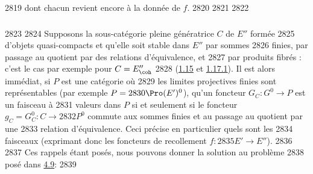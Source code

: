   2819	dont chacun revient encore à la donnée de $f$.
  2820	
  2821	\setcounter{subsubsection}{9}
  2822	\subsubsection{}
  2823	
  2824	Supposons la sous-catégorie pleine génératrice $C$ de $E''$ formée
  2825	d'objets quasi-compacts et qu'elle soit stable dans $E''$ par sommes
  2826	finies, par passage au quotient par des relations d'équivalence, et
  2827	par produits fibrés : c'est le cas par exemple pour $C = E''_{\coh}$
  2828	(\hyperref[VI.cor1.15]{1.15} et \hyperref[VI.cor1.17.1]{1.17.1}). Il est alors immédiat, si $P$ est une catégorie où
  2829	les limites projectives finies sont représentables (par exemple $P =
  2830	\Pro(E')^{0}$), qu'un foncteur $G_C : G^{0} \to P$ est un faisceau à
  2831	valeurs dans $P$ si et seulement si le foncteur $g_C = G_C^0 : C \to
  2832	P^0$ commute aux sommes finies et au passage au quotient par une
  2833	relation d'équivalence. Ceci précise en particulier quels sont les
  2834	faisceaux  (exprimant donc les foncteurs de recollement $f :
  2835	E'\to E''$).
  2836	
  2837	Ces rappels étant posés, nous pouvons donner la solution au problème
  2838	posé dans \hyperref[VI.subsec4.9]{4.9}:
  2839	
